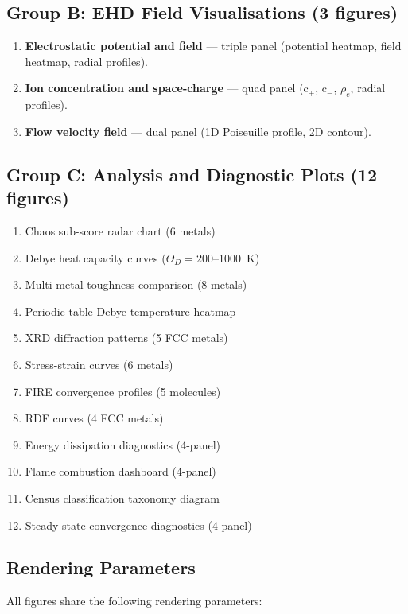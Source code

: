 \documentclass[11pt,a4paper]{article}
\begin{document}
\subsection{Group B: EHD Field Visualisations (3 figures)}

\begin{enumerate}
  \item \textbf{Electrostatic potential and field} ---
        triple panel (potential heatmap, field heatmap, radial profiles).
  \item \textbf{Ion concentration and space-charge} ---
        quad panel (c$_+$, c$_-$, $\rho_e$, radial profiles).
  \item \textbf{Flow velocity field} ---
        dual panel (1D Poiseuille profile, 2D contour).
\end{enumerate}

\subsection{Group C: Analysis and Diagnostic Plots (12 figures)}

\begin{enumerate}
  \item Chaos sub-score radar chart (6 metals)
  \item Debye heat capacity curves ($\Theta_D = 200$--1000~K)
  \item Multi-metal toughness comparison (8 metals)
  \item Periodic table Debye temperature heatmap
  \item XRD diffraction patterns (5 FCC metals)
  \item Stress-strain curves (6 metals)
  \item FIRE convergence profiles (5 molecules)
  \item RDF curves (4 FCC metals)
  \item Energy dissipation diagnostics (4-panel)
  \item Flame combustion dashboard (4-panel)
  \item Census classification taxonomy diagram
  \item Steady-state convergence diagnostics (4-panel)
\end{enumerate}

\subsection{Rendering Parameters}

All figures share the following rendering parameters:
\end{document}
